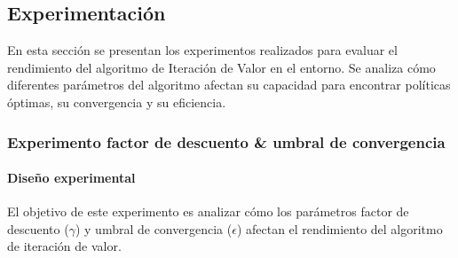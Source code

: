 \subsection{Experimentación}

En esta sección se presentan los experimentos realizados para evaluar el rendimiento del algoritmo de Iteración de Valor en el entorno. Se analiza cómo diferentes parámetros del algoritmo afectan su capacidad para encontrar políticas óptimas, su convergencia y su eficiencia.

\subsubsection{Experimento factor de descuento \& umbral de convergencia}

\paragraph{Diseño experimental}
El objetivo de este experimento es analizar cómo los parámetros factor de descuento (\(\gamma\)) y umbral de convergencia (\(\epsilon\)) afectan el rendimiento del algoritmo de iteración de valor.

